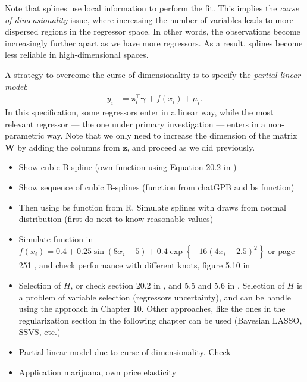 Note that splines use local information to perform the fit. This implies the \textit{curse of dimensionality} issue, where increasing the number of variables leads to more dispersed regions in the regressor space. In other words, the observations become increasingly further apart as we have more regressors. As a result, splines become less reliable in high-dimensional spaces.

A strategy to overcome the curse of dimensionality is to specify the \textit{partial linear model}: 
\begin{align*} 
	y_i & = \boldsymbol{z}_i^{\top}\boldsymbol{\gamma} + f(x_i) + \mu_i. 
\end{align*} 
In this specification, some regressors enter in a linear way, while the most relevant regressor — the one under primary investigation — enters in a non-parametric way. Note that we only need to increase the dimension of the matrix $\boldsymbol{W}$ by adding the columns from $\boldsymbol{z}$, and proceed as we did previously.

\begin{itemize}
	\item Show cubic B-spline (own function using Equation 20.2 in \cite{gelman2021bayesian})
	\item Show sequence of cubic B-splines (function from chatGPB and bs function)
	\item Then using bs function from R. Simulate splines with draws from normal distribution (first do next to know reasonable values)
	\item Simulate function in $f(x_i)=0.4+0.25 \sin(8x_i-5)+0.4\exp\left\{-16(4x_i-2.5)^2\right\}$ \cite{Otsu2017} or page 251 \cite{koop2003bayesian}, and check performance with different knots, figure 5.10 in \cite{BMCP2021}
	\item Selection of $H$, or check section 20.2 in \cite{gelman2021bayesian}, and 5.5 and 5.6 in \cite{BMCP2021}. Selection of $H$ is a problem of variable selection (regressors uncertainty), and can be handle using the approach in Chapter 10. Other approaches, like the ones in the regularization section in the following chapter can be used (Bayesian LASSO, SSVS, etc.) 
	\item Partial linear model due to curse of dimensionality. Check \cite{koop2003bayesian}
	\item Application marijuana, own price elasticity	
\end{itemize}




